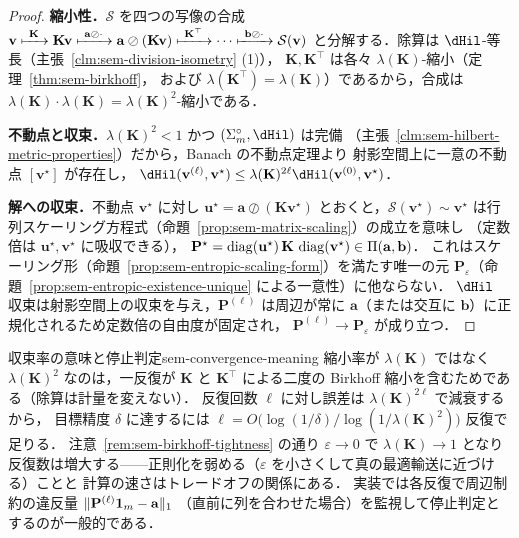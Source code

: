 \begin{proof}
  \textbf{縮小性．}$\mathcal{S}$ を四つの写像の合成
  $\mathbf{v} \xmapsto{\ \mathbf{K}\ } \mathbf{K}\mathbf{v}
  \xmapsto{\ \mathbf{a}\oslash\cdot\ } \mathbf{a}\oslash(\mathbf{K}\mathbf{v})
  \xmapsto{\ \mathbf{K}^\top\ } \cdots
  \xmapsto{\ \mathbf{b}\oslash\cdot\ } \mathcal{S}(\mathbf{v})$
  と分解する．除算は $\dHil$-等長（主張~\ref{clm:sem-division-isometry} (1)），
  $\mathbf{K}, \mathbf{K}^\top$ は各々 $\lambda(\mathbf{K})$-縮小（定理~\ref{thm:sem-birkhoff}，
  および $\lambda(\mathbf{K}^\top)=\lambda(\mathbf{K})$）であるから，合成は
  $\lambda(\mathbf{K})\cdot\lambda(\mathbf{K}) = \lambda(\mathbf{K})^2$-縮小である．

  \textbf{不動点と収束．}$\lambda(\mathbf{K})^2 < 1$ かつ $(\simplex_m^\circ, \dHil)$ は完備
  （主張~\ref{clm:sem-hilbert-metric-properties}）だから，Banach の不動点定理より
  射影空間上に一意の不動点 $[\mathbf{v}^\star]$ が存在し，
  $\dHil(\mathbf{v}^{(\ell)}, \mathbf{v}^\star) \leq \lambda(\mathbf{K})^{2\ell}\dHil(\mathbf{v}^{(0)}, \mathbf{v}^\star)$．

  \textbf{解への収束．}不動点 $\mathbf{v}^\star$ に対し
  $\mathbf{u}^\star = \mathbf{a}\oslash(\mathbf{K}\mathbf{v}^\star)$ とおくと，$\mathcal{S}(\mathbf{v}^\star) \sim \mathbf{v}^\star$
  は行列スケーリング方程式（命題~\ref{prop:sem-matrix-scaling}）の成立を意味し
  （定数倍は $\mathbf{u}^\star, \mathbf{v}^\star$ に吸収できる），
  $\mathbf{P}^\star = \operatorname{diag}(\mathbf{u}^\star)\,\mathbf{K}\,\operatorname{diag}(\mathbf{v}^\star) \in \Pi(\mathbf{a}, \mathbf{b})$．
  これはスケーリング形（命題~\ref{prop:sem-entropic-scaling-form}）を満たす唯一の元
  $\mathbf{P}_\varepsilon$（命題~\ref{prop:sem-entropic-existence-unique} による一意性）に他ならない．
  $\dHil$ 収束は射影空間上の収束を与え，$\mathbf{P}^{(\ell)}$ は周辺が常に
  $\mathbf{a}$（または交互に $\mathbf{b}$）に正規化されるため定数倍の自由度が固定され，
  $\mathbf{P}^{(\ell)} \to \mathbf{P}_\varepsilon$ が成り立つ．
\end{proof}

\begin{remark}{収束率の意味と停止判定}{sem-convergence-meaning}
  縮小率が $\lambda(\mathbf{K})$ ではなく $\lambda(\mathbf{K})^2$ なのは，一反復が $\mathbf{K}$ と
  $\mathbf{K}^\top$ による二度の Birkhoff 縮小を含むためである（除算は計量を変えない）．
  反復回数 $\ell$ に対し誤差は $\lambda(\mathbf{K})^{2\ell}$ で減衰するから，
  目標精度 $\delta$ に達するには $\ell = O\bigl(\log(1/\delta) / \log(1/\lambda(\mathbf{K})^2)\bigr)$ 反復で足りる．
  注意~\ref{rem:sem-birkhoff-tightness} の通り $\varepsilon \to 0$ で $\lambda(\mathbf{K}) \to 1$ となり
  反復数は増大する——正則化を弱める（$\varepsilon$ を小さくして真の最適輸送に近づける）ことと
  計算の速さはトレードオフの関係にある．
  実装では各反復で周辺制約の違反量 $\lVert \mathbf{P}^{(\ell)}\mathbf{1}_m - \mathbf{a} \rVert_1$
  （直前に列を合わせた場合）を監視して停止判定とするのが一般的である．
\end{remark}
